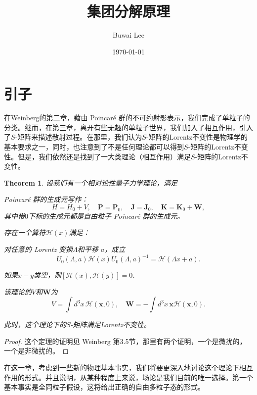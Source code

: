 \documentclass[11pt]{article}
\title{集团分解原理}
\date{\today}
\author{Buwai Lee}
\theoremstyle{definition}
\theoremstyle{plain}
\newtheorem{thm}[para]{Theorem}
\begin{document}
\maketitle
\tableofcontents

\section{引子}

在Weinberg的第二章，藉由 Poincar\'{e} 群的不可约射影表示，我们完成了单粒子的分类。继而，在第三章，离开有些无趣的单粒子世界，我们加入了相互作用，引入了$S$-矩阵来描述散射过程。在那里，我们认为$S$-矩阵的Lorentz不变性是物理学的基本要求之一，同时，也注意到了不是任何理论都可以得到$S$-矩阵的Lorentz不变性。但是，我们依然还是找到了一大类理论（相互作用）满足$S$-矩阵的Lorentz不变性。

\begin{thm}
设我们有一个相对论性量子力学理论，满足
\begin{compactenum}
\item Poincar\'{e} 群的生成元写作：\[H=H_0+V,\quad \mathbf{P}= \mathbf{P}_0,\quad \mathbf{J}= \mathbf{J}_0,\quad \mathbf{K}=\mathbf{K}_0+\mathbf{W},\]其中带$0$下标的生成元都是自由粒子 Poincar\'{e} 群的生成元。

\item  存在一个算符$\mathscr{H}(x)$满足：
\begin{compactitem}
    \item 对任意的 Lorentz 变换$\Lambda$和平移 $a$，成立\[U_0(\Lambda,a)\mathscr{H}(x)U_0(\Lambda,a)^{-1}=\mathscr H(\Lambda x+a).\]

    \item 如果$x-y$类空，则$[\mathscr{H}(x),\mathscr{H}(y)]=0$.
\end{compactitem}
\item 该理论的$V$和$\mathbf{W}$为\[V=\int d^3 x\, \mathscr{H}(\mathbf{x},0),\quad\mathbf{W}=-\int d^3 x \, \mathbf{x}\mathscr{H}(\mathbf{x},0).\]
\end{compactenum}
此时，这个理论下的$S$-矩阵满足Lorentz不变性。
\end{thm}

\begin{proof}
这个定理的证明见 Weinberg 第3.5节，那里有两个证明，一个是微扰的，一个是非微扰的。
\end{proof}

在这一章，考虑到一些新的物理基本事实，我们将要更深入地讨论这个理论下相互作用的形式。并且说明，从某种程度上来说，场论是我们目前的唯一选择。第一个基本事实是全同粒子假设，这将给出正确的自由多粒子态的形式。
\end{document}
